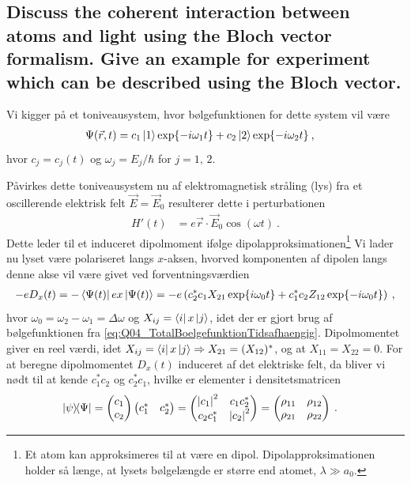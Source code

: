 \subsection{Discuss the coherent interaction between atoms and light using the Bloch vector formalism. Give an example for experiment which can be described using the Bloch vector.}


Vi kigger på et toniveausystem, hvor bølgefunktionen for dette system vil være
\begin{align} \label{eq:Q04_TotalBoelgefunktionTidsafhaengig}
    \Psi(\Vec{r},t) &= c_1\ket{1}\exp{-i\omega_1 t} + c_2\ket{2}\exp{-i\omega_2 t} \: ,
\end{align}
hvor $c_j = c_j(t)$ og $\omega_j = E_j/\hbar$ for $j = 1,\,2$.

Påvirkes dette toniveausystem nu af elektromagnetisk stråling (lys) fra et oscillerende elektrisk felt $\Vec{E} = \Vec{E}_0$ resulterer dette i perturbationen
\begin{align}
    H'(t) &= e\Vec{r} \cdot \Vec{E}_0 \cos(\omega t) \: .
\end{align}
Dette leder til et induceret dipolmoment ifølge \textsf{dipolapproksimationen}\footnote{Et atom kan approksimeres til at være en dipol. Dipolapproksimationen holder så længe, at lysets bølgelængde er større end atomet, $\lambda \gg a_0$.} Vi lader nu lyset være polariseret langs $x$-aksen, hvorved komponenten af dipolen langs denne akse vil være givet ved forventningsværdien
\begin{align} \label{eq:Q04_ElektronladningGangeInduceretDipolmoment}
    -eD_x(t) = -\bra{\Psi(t)}ex\ket{\Psi(t)} = -e\left(c_2^*c_1X_{21}\exp{i\omega_0 t} + c_1^*c_2Z_{12}\exp{-i\omega_0 t}\right) \: ,
\end{align}
hvor $\omega_0 = \omega_2 - \omega_1 = \Delta \omega$ og $X_{ij} = \bra{i}x\ket{j}$, idet der er gjort brug af bølgefunktionen fra \cref{eq:Q04_TotalBoelgefunktionTidsafhaengig}. Dipolmomentet giver en reel værdi, idet $X_{ij} = \bra{i}x\ket{j} \Rightarrow X_{21} = (X_{12})^*$, og at $X_{11} = X_{22} = 0$. For at beregne dipolmomentet $D_x(t)$ induceret af det elektriske felt, da bliver vi nødt til at kende $c_1^*c_2$ og $c_2^*c_1$, hvilke er elementer i \textsf{densitetsmatricen}
\begin{align} \label{eq:Q04_DensityMatrix}
    \ketbra{\psi}{\Psi} &=
        \begin{pmatrix}
            c_1 \\
            c_2
        \end{pmatrix}
        \begin{pmatrix}
            c_1^* & c_2^*
        \end{pmatrix}
    = \begin{pmatrix}
            \abs{c_1}^2 & c_1c_2^* \\
            c_2c_1^* & \abs{c_2}^2
        \end{pmatrix}
    = \begin{pmatrix}
            \rho_{11} & \rho_{12} \\
            \rho_{21} & \rho_{22} \\
        \end{pmatrix}
    \: .
\end{align}

